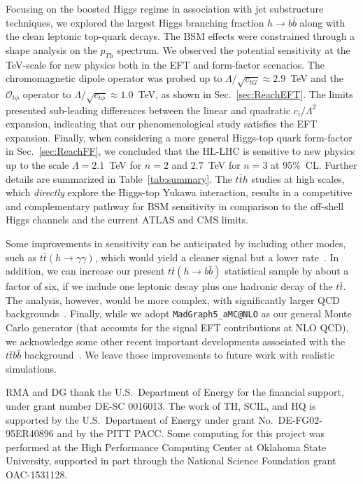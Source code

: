 \documentclass[reprint, aps,prd, preprintnumbers,groupedaddress,nofootinbib]{revtex4-1}
\begin{document}
 Focusing on the boosted Higgs regime in association with jet substructure techniques, we explored the largest Higgs branching fraction $h\to b\bar{b}$ along with the clean leptonic top-quark decays. The BSM effects were constrained through a shape analysis on the  $p_{Th}$ spectrum. We observed the potential sensitivity at the  TeV-scale for new physics both in the EFT and form-factor scenarios. The chromomagnetic dipole operator was probed up to ${\Lambda/\sqrt{c_{tG}}\approx 2.9}$~TeV and the $\mathcal{O}_{t\phi}$ operator to ${\Lambda/\sqrt{c_{t\phi}}\approx 1.0}$~TeV, as shown in  Sec.~\ref{sec:ReachEFT}. The limits presented  sub-leading differences between the linear and quadratic $c_i/\Lambda^2$ expansion, indicating that our phenomenological study satisfies the EFT expansion. Finally, when considering a more general  Higgs-top quark form-factor in Sec.~\ref{sec:ReachFF}, we concluded that the HL-LHC is sensitive to new physics up to the scale $\Lambda=2.1$~TeV for $n=2$ and $2.7$~TeV for $n=3$ at 95\%~CL. Further details are summarized in Table~\ref{tab:summary}. The $t\bar t h$ studies at high scales, which \emph{directly} explore the Higgs-top Yukawa interaction, results in a competitive and complementary pathway for BSM sensitivity in comparison to the off-shell Higgs channels and the current ATLAS and CMS limits.   

 Some improvements in sensitivity can be anticipated by including other modes, such as $t\bar{t}(h\to \gamma\gamma)$, which would yield a cleaner signal but a lower rate~\cite{Brehmer:2019xox}. In addition, we can increase our present $t\bar{t}(h\to b\bar{b})$  statistical sample by about a factor of six, if we include one leptonic decay plus one hadronic decay of the $t\bar t$. The analysis, however, would be more complex, with significantly larger QCD  backgrounds~\cite{Aaboud:2017rss}. Finally, while we adopt {\tt MadGraph5\_aMC@NLO} as our general Monte Carlo generator (that accounts for the signal EFT contributions at NLO QCD), we acknowledge some other recent important developments associated with the $t\bar{t}b\bar{b}$ background~\cite{Jezo:2018yaf,Denner:2020orv,Bevilacqua:2021cit}. We leave those improvements to future work with realistic simulations. 

\begin{acknowledgments}
RMA and DG thank the U.S.~Department of Energy for the financial support, under grant number DE-SC 0016013. The work of TH, SCIL, and HQ is supported by the U.S.~Department of Energy under grant No.~DE-FG02-95ER40896 and by the PITT PACC. Some computing for this project was performed at the High Performance Computing Center at Oklahoma State University, supported in part through the National Science Foundation grant OAC-1531128.
\end{acknowledgments}



\end{document}
